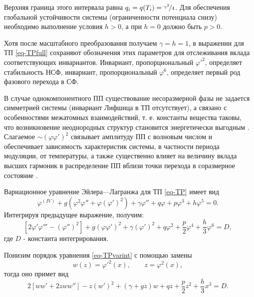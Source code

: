 Верхняя граница этого интервала равна \cite{Ishibashi1978} $q_i = q(T_i) = \nicefrac{\gamma^2}{4}$.
Для обеспечения глобальной устойчивости системы (ограниченности потенциала снизу) необходимо выполнение условия $h>0$, а при $h=0$ должно быть $p>0$.

Хотя после масштабного преобразования получаем $\gamma=h=1$, в выражении для ТП \ref{eq-TPfull} сохраняют обозначения этих параметров для отслеживания вклада соответствующих инвариантов.
Инвариант, пропорциональный $\varphi'^2$, определяет стабильность НСФ, инвариант, пропорциональный $\varphi^6$, определяет первый род фазового перехода в СФ.

В случае однокомпонентного ПП существование несоразмерной фазы не задается симметрией системы (инвариант Лифшица в ТП отсутствует), а связано с особенностями  межатомных взаимодействий, т. е. константы вещества таковы, что возникновение неоднородных структур становится энергетически выгодным \cite{Klepikov1996}.
Слагаемое $\sim\left(\varphi\varphi'\right)^2$ связывает амплитуду ПП с волновым числом и обеспечивает зависимость характеристик системы, в частности периода модуляции, от температуры, а также существенно влияет на величину вклада высших гармоник в распределение ПП вблизи точки перехода в соразмерное состояние \cite{Berezovsky1998, Berezovsky1998ua}.

Вариационное уравнение Эйлера—Лагранжа для ТП \ref{eq-TP} имеет вид
\begin{equation}
\varphi^{(IV)} + 
g\left(\varphi^2\varphi'' + \varphi\left(\varphi'\right)^2\right) +
\gamma\varphi'' + q\varphi + p\varphi^3 + h\varphi^5 = 0.
\label{eq-TPvar}
\end{equation}
Интегрируя предыдущее выражение, получим:
\begin{equation}
\left[2\varphi'\varphi''' - \left(\varphi''\right)^2\right] +
g\left(\varphi\varphi'\right)^2 + \gamma\left(\varphi'\right)^2 +
q\varphi^2 +\frac{p}{2}\varphi^4 + \frac{h}{3}\varphi^6 = D,
\label{eq-TPvarint}
\end{equation}
где $D$ - константа интегрирования.

Понизим порядок уравнения \ref{eq-TPvarint} с помощью замены
\begin{equation}
w(z) = \varphi'^2(x), \qquad z = \varphi^2(x),
\label{eq-wsubst}
\end{equation}
тогда оно примет вид
\begin{equation}
2\left[ww' + 2zww''\right] - z\left(w'\right)^2 + (\gamma+gz)w +
qz +\frac{p}{2}z^2 + \frac{h}{3}x^3 = D.
\label{eq-varwsubst}
\end{equation}

